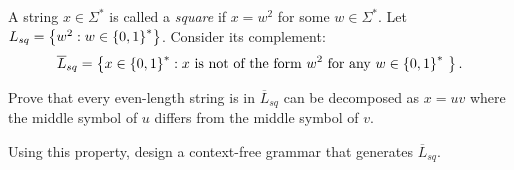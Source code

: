 \begin{problem}
  A string $x \in \Sigma^*$ is called a \emph{square}
  if $x = w^2$ for some $w \in \Sigma^*$.
  Let $L_{sq} = \left\{w^2 : w \in \left\{0, 1\right\}^*\right\}$.
  Consider its complement:
  \[ \overline{L}_{sq} =
    \left\{x \in \left\{0, 1\right\}^* : x
      \text{
        is not of the form $w^2$ for any $w \in \left\{0, 1\right\}^*$
      }
    \right\}.
  \]

  \step
  \begin{enumalph}
    \item Prove that every even-length string is in $\overline{L}_{sq}$
      can be decomposed as $x = uv$ where the middle symbol of $u$
      differs from the middle symbol of $v$.
    \item Using this property, design a context-free grammar that
      generates $\overline{L}_{sq}$.
  \end{enumalph}
\end{problem}
